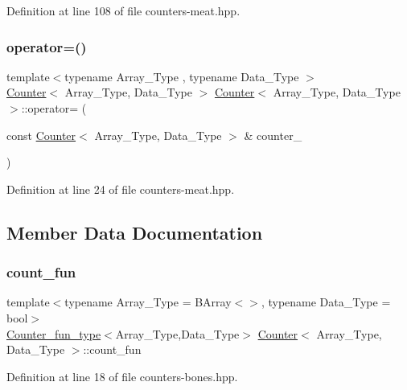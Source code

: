 Definition at line 108 of file counters-\/meat.\+hpp.

\mbox{\label{class_counter_a058b8f695d6b6493c5d03aee8c01a86c}} 
\subsubsection{\texorpdfstring{operator=()}{operator=()}}
{\footnotesize\ttfamily template$<$typename Array\+\_\+\+Type , typename Data\+\_\+\+Type $>$ \\
\hyperlink{class_counter}{Counter}$<$ Array\+\_\+\+Type, Data\+\_\+\+Type $>$ \hyperlink{class_counter}{Counter}$<$ Array\+\_\+\+Type, Data\+\_\+\+Type $>$\+::operator= (\begin{DoxyParamCaption}\item[{const \hyperlink{class_counter}{Counter}$<$ Array\+\_\+\+Type, Data\+\_\+\+Type $>$ \&}]{counter\+\_\+ }\end{DoxyParamCaption})}



Definition at line 24 of file counters-\/meat.\+hpp.



\subsection{Member Data Documentation}
\mbox{\label{class_counter_a804d287379ef9b4204a0838edcce3b71}} 
\subsubsection{\texorpdfstring{count\+\_\+fun}{count\_fun}}
{\footnotesize\ttfamily template$<$typename Array\+\_\+\+Type = B\+Array$<$$>$, typename Data\+\_\+\+Type = bool$>$ \\
\hyperlink{typedefs_8hpp_ac0160f52f564dea3ac033b374cffbfe7}{Counter\+\_\+fun\+\_\+type}$<$Array\+\_\+\+Type,Data\+\_\+\+Type$>$ \hyperlink{class_counter}{Counter}$<$ Array\+\_\+\+Type, Data\+\_\+\+Type $>$\+::count\+\_\+fun}



Definition at line 18 of file counters-\/bones.\+hpp.

\mbox{\label{class_counter_a9ebfed99a67888f80c19cabc4098bdd0}} 
